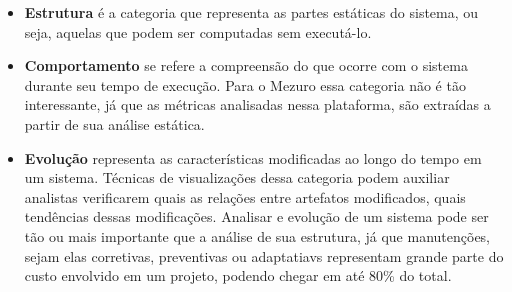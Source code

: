 \begin{itemize}
\item \textbf{Estrutura} é a categoria que representa as partes estáticas do sistema, ou seja, aquelas que podem ser computadas sem executá-lo. 


\item \textbf{Comportamento} se refere a compreensão do que ocorre com o sistema durante seu tempo de execução. Para o Mezuro essa categoria não é tão interessante, já que as métricas analisadas nessa plataforma, são extraídas a partir de sua análise estática.


\item \textbf{Evolução} representa as características modificadas ao longo do tempo em um sistema. Técnicas de visualizações dessa categoria podem auxiliar analistas verificarem quais as relações entre artefatos modificados, quais tendências dessas modificações. Analisar e evolução de um sistema pode ser tão ou mais importante que a análise de sua estrutura, já que manutenções, sejam elas corretivas, preventivas ou adaptatiavs representam grande parte do custo envolvido em um projeto, podendo chegar em até 80\% do total.

%
%
%

\end{itemize}













